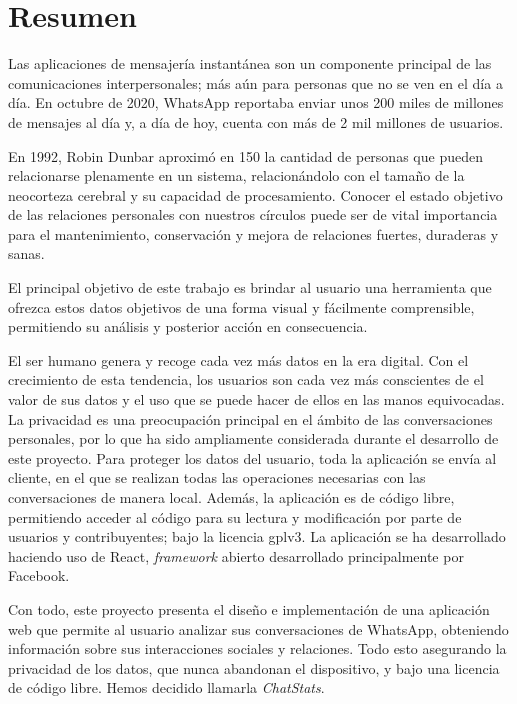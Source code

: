 \cleardoublepage
{}
\chapter*{Resumen}

Las aplicaciones de mensajería instantánea son un componente principal de las comunicaciones interpersonales; más aún para personas que no se ven en el día a día. En octubre de 2020, WhatsApp reportaba enviar unos 200 miles de millones de mensajes al día \cite{whatsAppsPerDay} y, a día de hoy, cuenta con más de 2 mil millones de usuarios.\cite{whatsAppsUsers}

En 1992, Robin Dunbar aproximó en 150 la cantidad de personas que pueden relacionarse plenamente en un sistema, relacionándolo con el tamaño de la neocorteza cerebral y su capacidad de procesamiento.\cite{dunbarNumber} Conocer el estado objetivo de las relaciones personales con nuestros círculos puede ser de vital importancia para el mantenimiento, conservación y mejora de relaciones fuertes, duraderas y sanas.

El principal objetivo de este trabajo es brindar al usuario una herramienta que ofrezca estos datos objetivos de una forma visual y fácilmente comprensible, permitiendo su análisis y posterior acción en consecuencia.

El ser humano genera y recoge cada vez más datos en la era digital. Con el crecimiento de esta tendencia, los usuarios son cada vez más conscientes de el valor de sus datos y el uso que se puede hacer de ellos en las manos equivocadas. La privacidad es una preocupación principal en el ámbito de las conversaciones personales, por lo que ha sido ampliamente considerada durante el desarrollo de este proyecto. Para proteger los datos del usuario, toda la aplicación se envía al cliente, en el que se realizan todas las operaciones necesarias con las conversaciones de manera local. Además, la aplicación es de código libre, permitiendo acceder al código para su lectura y modificación por parte de usuarios y contribuyentes; bajo la licencia \acrfull{gplv3}.\cite{GPLv3} La aplicación se ha desarrollado haciendo uso de React, \textit{framework} abierto desarrollado principalmente por Facebook.

Con todo, este proyecto presenta el diseño e implementación de una aplicación web que permite al usuario analizar sus conversaciones de WhatsApp, obteniendo información sobre sus interacciones sociales y relaciones. Todo esto asegurando la privacidad de los datos, que nunca abandonan el dispositivo, y bajo una licencia de código libre. Hemos decidido llamarla \textit{ChatStats}.

